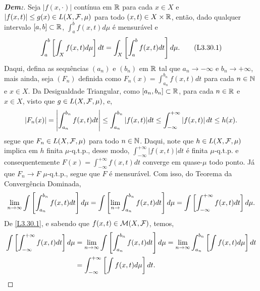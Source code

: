 \begin{proof}[\textbf{Dem:}] Seja  $|f(x, \cdot)|$ contínua em $\mathbb R$ para cada $x \in X$
  e $|f(x, t)| \le g(x) \in L(X, \mathcal F, \mu)$ para todo
  $(x, t) \in X\times \mathbb R$, então, dado qualquer intervalo
  $[a, b] \subset \mathbb R$, $\int_a^b f(x, t) d\mu$ é mensurável e
  \begin{align*}
    \int_{a}^b \left[\int_X f(x,t)d\mu\right]dt = \int_X \left[\int_a^b f(x,t)dt\right]d\mu.
    \label{L3.30.1}\tag{L3.30.1}
  \end{align*}
  Daqui, defina as sequências $(a_n)$ e $(b_n)$ em $\mathbb R$ tal que 
  $a_n \rightarrow -\infty$ e $b_n \rightarrow +\infty$, mais ainda, seja 
  $(F_n)$ definida como $F_n(x) = \int_{a_n}^{b_n} f(x, t) dt$ para cada $n \in \mathbb N$
  e $x \in X$.
  Da Desigualdade Triangular, como $[a_n , b_n] \subset \mathbb R$, para cada $n \in \mathbb R$
  e $x \in X$, visto que $g \in L(X, \mathcal F, \mu)$, e,
  \begin{align*}
    |F_n(x)| = \left|\int_{a_n}^{b_n} f(x, t) dt\right| \le 
     \int_{a_n}^{b_n} |f(x, t)| dt \le \int_{-\infty}^{+\infty}\left|f(x,t)\right|dt 
    \le h(x).
  \end{align*}
  segue que $F_n \in L(X, \mathcal F, \mu)$ para todo $n \in \mathbb N$. Daqui, note que 
  $h \in L(X, \mathcal F, \mu)$ implica em $h$ finita $\mu$-q.t.p., desse modo, 
  $\int_{-\infty}^{+\infty} |f(x, t)|dt$ é finita $\mu$-q.t.p. e consequentemente 
  $F(x) = \int_{-\infty}^{+\infty} f(x,t)dt$ converge em quase-$\mu$ todo ponto. Já que 
  $F_n \rightarrow F$ $\mu$-q.t.p., segue que $F$ é mensurável. Com isso, do Teorema 
  da Convergência Dominada, 
  \begin{align*}
    \lim_{n \rightarrow \infty} \int \left[\int_{a_n}^{b_n} f(x, t) dt\right]d\mu 
    = \int \left[\lim_{n \rightarrow} \int_{a_n}^{b_n} f(x, t) dt\right]d\mu = 
    \int \left[\int_{-\infty}^{+\infty} f(x,t) dt\right]d\mu.
  \end{align*}
  De \eqref{L3.30.1}, e sabendo que $f(x,t) \in \mathcal M(X, \mathcal F)$, temos, 
  \begin{align*}
    \int \left[\int_{-\infty}^{+\infty} f(x,t)dt\right]d\mu 
    &= \lim_{n \rightarrow \infty} \int \left[\int_{a_n}^{b_n} f(x, t)dt \right]d\mu 
    = \lim_{n \rightarrow \infty} \int_{a_n}^{b_n} \left[\int f(x, t)d\mu\right]dt\\
    &= \int_{-\infty}^{+\infty}\left[\int f(x,t)d\mu\right]dt.
  \end{align*}
\end{proof}


